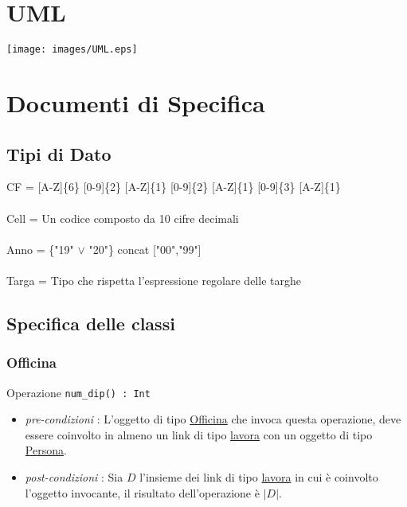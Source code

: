 \documentclass[12pt, letterpaper]{article}
\newcommand{\acc}{\\\hphantom{}\\}
\newcommand{\code}[1]{\colorbox{light-gray}{\texttt{#1}}}
\begin{document}
\section{UML}
\begin{center}
    \texttt{[image: images/UML.eps]}
\end{center}
\newpage
\section{Documenti di Specifica}
\subsection{Tipi di Dato}
CF = [A-Z]\{6\} [0-9]\{2\} [A-Z]\{1\} [0-9]\{2\} [A-Z]\{1\} [0-9]\{3\} [A-Z]\{1\}\acc 
Cell = Un codice composto da 10 cifre decimali\acc 
Anno = \{"19" $\lor$ "20"\} concat ["00","99"]\acc 
Targa = Tipo che rispetta l'espressione regolare delle targhe 
\subsection{Specifica delle classi}
\subsubsection{Officina}
Operazione \code{num\_dip() : Int}\begin{itemize}
    \item \textit{pre-condizioni} : L'oggetto di tipo \underline{Officina} che 
    invoca questa operazione, deve essere coinvolto in almeno un link di tipo 
    \underline{lavora} con un oggetto di tipo \underline{Persona}.
    \item \textit{post-condizioni} : Sia $D$ l'insieme dei link di tipo 
    \underline{lavora} in cui è coinvolto l'oggetto invocante, il risultato 
    dell'operazione è $|D|$.
\end{itemize}
\end{document}
